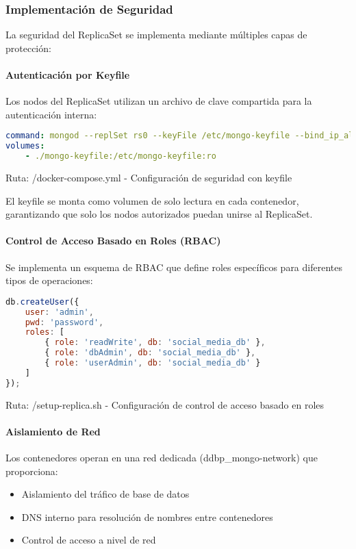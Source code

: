 \documentclass[12pt,letterpaper]{article}
\begin{document}
\subsubsection{Implementación de Seguridad}
La seguridad del ReplicaSet se implementa mediante múltiples capas de protección:

\paragraph{Autenticación por Keyfile}
Los nodos del ReplicaSet utilizan un archivo de clave compartida para la autenticación interna:

\begin{lstlisting}[language=yaml]
command: mongod --replSet rs0 --keyFile /etc/mongo-keyfile --bind_ip_all --auth --port 27017
volumes:
    - ./mongo-keyfile:/etc/mongo-keyfile:ro
\end{lstlisting}
\small{Ruta: /docker-compose.yml - Configuración de seguridad con keyfile}

El keyfile se monta como volumen de solo lectura en cada contenedor, garantizando que solo los nodos autorizados puedan unirse al ReplicaSet.

\paragraph{Control de Acceso Basado en Roles (RBAC)}
Se implementa un esquema de RBAC que define roles específicos para diferentes tipos de operaciones:

\begin{lstlisting}[language=javascript]
db.createUser({
    user: 'admin',
    pwd: 'password',
    roles: [
        { role: 'readWrite', db: 'social_media_db' },
        { role: 'dbAdmin', db: 'social_media_db' },
        { role: 'userAdmin', db: 'social_media_db' }
    ]
});
\end{lstlisting}
\small{Ruta: /setup-replica.sh - Configuración de control de acceso basado en roles}

\paragraph{Aislamiento de Red}
Los contenedores operan en una red dedicada (ddbp\_mongo-network) que proporciona:

\begin{itemize}
    \item Aislamiento del tráfico de base de datos
    \item DNS interno para resolución de nombres entre contenedores
    \item Control de acceso a nivel de red
\end{itemize}
\end{document}

